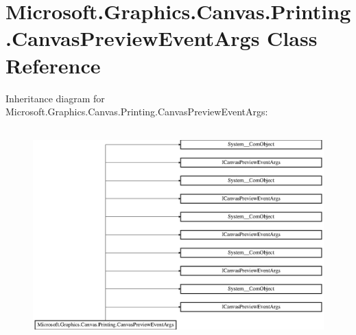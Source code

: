 \hypertarget{class_microsoft_1_1_graphics_1_1_canvas_1_1_printing_1_1_canvas_preview_event_args}{}\section{Microsoft.\+Graphics.\+Canvas.\+Printing.\+Canvas\+Preview\+Event\+Args Class Reference}
\label{class_microsoft_1_1_graphics_1_1_canvas_1_1_printing_1_1_canvas_preview_event_args}
Inheritance diagram for Microsoft.\+Graphics.\+Canvas.\+Printing.\+Canvas\+Preview\+Event\+Args\+:\begin{figure}[H]
\begin{center}
\leavevmode
\includegraphics[height=8.235293cm]{class_microsoft_1_1_graphics_1_1_canvas_1_1_printing_1_1_canvas_preview_event_args}
\end{center}
\end{figure}
